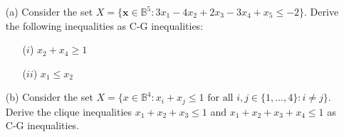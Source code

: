 \begin{enumerate}
\item[(a)] Consider the set $X = \{\mathbf{x} \in \mathbb{B}^5 : 3x_1 - 4x_2 + 2x_3 - 3x_4 + x_5 \leq -2 \}$. Derive the following inequalities as C-G inequalities:
\begin{enumerate}
\item[($i$)] $x_2 + x_4 \geq 1$
\item[($ii$)] $x_1 \leq x_2$
\end{enumerate}
\item[(b)] Consider the set $X = \{x \in \mathbb{B}^4 : x_i + x_j \leq 1 \textrm{ for all } i,j\in \{1,\dots,4\} : i\neq j\}$. Derive the clique inequalities $x_1 + x_2 + x_3 \leq 1$ and $x_1+ x_2 + x_3 + x_4 \leq 1$ as C-G inequalities.
\end{enumerate}

